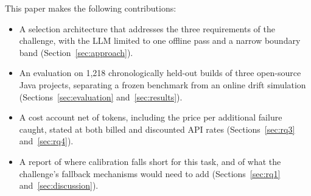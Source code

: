 This paper makes the following contributions:
\begin{itemize}
    \item A selection architecture that addresses the three requirements of the challenge, with the LLM limited to one offline pass and a narrow boundary band (Section~\ref{sec:approach}).
    \item An evaluation on 1,218 chronologically held-out builds of three open-source Java projects, separating a frozen benchmark from an online drift simulation (Sections~\ref{sec:evaluation} and~\ref{sec:results}).
    \item A cost account net of tokens, including the price per additional failure caught, stated at both billed and discounted API rates (Sections~\ref{sec:rq3} and~\ref{sec:rq4}).
    \item A report of where calibration falls short for this task, and of what the challenge's fallback mechanisms would need to add (Sections~\ref{sec:rq1} and~\ref{sec:discussion}).
\end{itemize}
